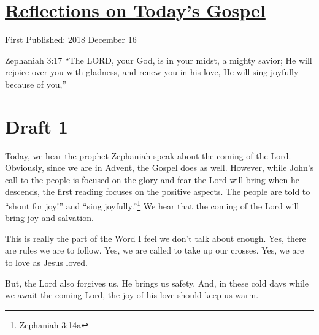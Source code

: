 \documentclass[12pt]{article}[titlepage]
\newcommand{\say}[1]{``#1''}
\newcommand{\1}{\={a}}
\newcommand{\2}{\={e}}
\newcommand{\3}{\={\i}}
\newcommand{\4}{\=o}
\newcommand{\5}{\=u}
\newcommand{\6}{\={A}}
\renewcommand{\,}{\textsuperscript{,}}
\begin{document}
\doublespacing
\section{\href{reflections-on-readings-3-advent-c.html}{Reflections on Today's Gospel}}
First Published: 2018 December 16

Zephaniah 3:17 \say{The LORD, your God, is in your midst, a mighty savior; He will rejoice over you with gladness, and renew you in his love, He will sing joyfully because of you,}

\section{Draft 1}
Today, we hear the prophet Zephaniah speak about the coming of the Lord.
Obviously, since we are in Advent, the Gospel does as well.
However, while John's call to the people is focused on the glory and fear the Lord will bring when he descends, the first reading focuses on the positive aspects.
The people are told to \say{shout for joy!} and \say{sing joyfully.}\footnote{Zephaniah 3:14a}
We hear that the coming of the Lord will bring joy and salvation.

This is really the part of the Word I feel we don't talk about enough.
Yes, there are rules we are to follow.
Yes, we are called to take up our crosses.
Yes, we are to love as Jesus loved.

But, the Lord also forgives us.
He brings us safety.
And, in these cold days while we await the coming Lord, the joy of his love should keep us warm.
\end{document}
